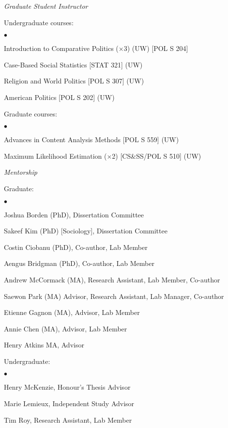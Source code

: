 \documentclass[margin,line]{res}
\newenvironment{list1}{
  \begin{list}{\ding{113}}{%
      \setlength{\itemsep}{0in}
      \setlength{\parsep}{0in} \setlength{\parskip}{0in}
      \setlength{\topsep}{0in} \setlength{\partopsep}{0in} 
      \setlength{\leftmargin}{0.17in}}}{\end{list}}
\newenvironment{list2}{
  \begin{list}{$\bullet$}{%
      \setlength{\itemsep}{0in}
      \setlength{\parsep}{0in} \setlength{\parskip}{0in}
      \setlength{\topsep}{0in} \setlength{\partopsep}{0in} 
      \setlength{\leftmargin}{0.2in}}}{\end{list}}
\begin{document}
{\begin{resume}
{\em Graduate Student Instructor } \\
\vspace{-.1in}
\begin{list1}
 \item[] Undergraduate courses:
   \begin{list2}
   \item[] Introduction to Comparative Politics ($\times$3) (UW)
   [POL S 204]
   \item[] Case-Based Social Statistics [STAT 321] (UW)
   \item[]Religion and World Politics [POL S 307] (UW)
     \item[] American Politics [POL S 202] (UW)
\end{list2}
\item[] Graduate courses:
   \begin{list2}
     \item [] Advances in Content Analysis Methods [POL S 559] (UW)
     \item [] Maximum Likelihood Estimation ($\times$2) [CS\&SS/POL S
       510] (UW)
\end{list2}
\end{list1}

\textbf{}
{\em Mentorship}\\
\vspace{-.1in}
\begin{list1}
\item[] Graduate:
  \begin{list2}
  \item[] Joshua Borden (PhD), Dissertation Committee
  \item[] Sakeef Kim (PhD) [Sociology], Dissertation Committee
  \item[] Costin Ciobanu (PhD), Co-author, Lab Member
  \item[] Aengus Bridgman (PhD), Co-author, Lab Member
   \item[] Andrew McCormack (MA), Research Assistant, Lab Member, Co-author
   \item[] Saewon Park (MA) Advisor, Research Assistant, Lab Manager, Co-author
   \item[] Etienne Gagnon (MA),  Advisor, Lab Member
   \item[] Annie Chen (MA), Advisor, Lab Member
   \item[] Henry Atkins MA, Advisor
     
\end{list2}

 \item[] Undergraduate:
   \begin{list2}
   \item[] Henry McKenzie, Honour's Thesis Advisor
   \item[] Marie Lemieux, Independent Study Advisor
   \item[] Tim Roy, Research Assistant, Lab Member
\end{list2}
\end{list1}


\end{resume}}
\end{document}
